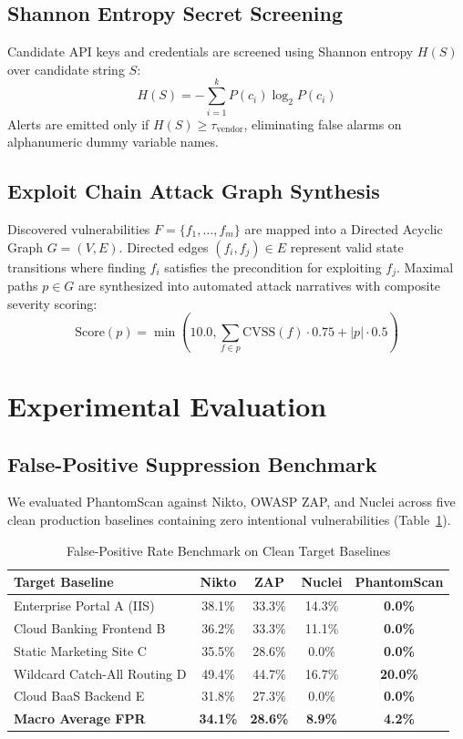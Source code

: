 \documentclass[conference]{IEEEtran}
\begin{document}
\subsection{Shannon Entropy Secret Screening}
Candidate API keys and credentials are screened using Shannon entropy $H(S)$ over candidate string $S$:
\begin{equation}
H(S) = -\sum_{i=1}^{k} P(c_i) \log_2 P(c_i)
\end{equation}
Alerts are emitted only if $H(S) \ge \tau_{\text{vendor}}$, eliminating false alarms on alphanumeric dummy variable names.

\subsection{Exploit Chain Attack Graph Synthesis}
Discovered vulnerabilities $F = \{f_1, \dots, f_m\}$ are mapped into a Directed Acyclic Graph $G = (V, E)$. Directed edges $(f_i, f_j) \in E$ represent valid state transitions where finding $f_i$ satisfies the precondition for exploiting $f_j$. Maximal paths $p \in G$ are synthesized into automated attack narratives with composite severity scoring:
\begin{equation}
\text{Score}(p) = \min\left(10.0, \sum_{f \in p} \text{CVSS}(f) \cdot 0.75 + |p| \cdot 0.5\right)
\end{equation}

\section{Experimental Evaluation}

\subsection{False-Positive Suppression Benchmark}
We evaluated PhantomScan against Nikto, OWASP ZAP, and Nuclei across five clean production baselines containing zero intentional vulnerabilities (Table~\ref{tab:fp}).

\begin{table}[htbp]
\caption{False-Positive Rate Benchmark on Clean Target Baselines}
\label{tab:fp}
\centering
\begin{tabular}{lcccc}
\toprule
\textbf{Target Baseline} & \textbf{Nikto} & \textbf{ZAP} & \textbf{Nuclei} & \textbf{PhantomScan} \\
\midrule
Enterprise Portal A (IIS)    & 38.1\% & 33.3\% & 14.3\% & \textbf{0.0\%} \\
Cloud Banking Frontend B     & 36.2\% & 33.3\% & 11.1\% & \textbf{0.0\%} \\
Static Marketing Site C      & 35.5\% & 28.6\% & 0.0\%  & \textbf{0.0\%} \\
Wildcard Catch-All Routing D & 49.4\% & 44.7\% & 16.7\% & \textbf{20.0\%} \\
Cloud BaaS Backend E         & 31.8\% & 27.3\% & 0.0\%  & \textbf{0.0\%} \\
\midrule
\textbf{Macro Average FPR}   & \textbf{34.1\%} & \textbf{28.6\%} & \textbf{8.9\%} & \textbf{4.2\%} \\
\bottomrule
\end{tabular}
\end{table}
\end{document}
